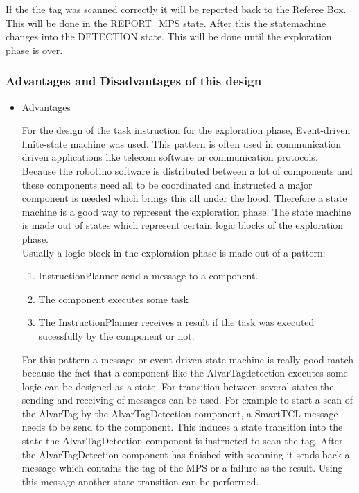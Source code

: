If the the tag was scanned correctly it will be reported back to the Referee Box. This will be done in the REPORT\_MPS state. After this the statemachine changes into the DETECTION state. This will be done until the exploration phase is over.

\subsubsection{Advantages and Disadvantages of this design} 

\begin{itemize}

\item Advantages

For the design of the task instruction for the exploration phase, Event-driven finite-state machine was used. This pattern is often used in communication driven applications
like telecom software or communication protocols. Because the robotino software is distributed between a lot of components and these components need all to be coordinated and instructed a major component is needed which brings this all under the hood. Therefore a state machine is a good way to represent the exploration phase. The state machine is made out of states which represent certain logic blocks of the exploration phase. \\


Usually a logic block in the exploration phase is made out of a pattern:

\begin{enumerate}

\item InstructionPlanner send a message to a component.

\item The component executes some task

\item The InstructionPlanner receives a result if the task was executed sucessfully by the 
component or not.  


\end{enumerate}

For this pattern a message or event-driven state machine is really good match because the fact that a component like the AlvarTagdetection executes some logic can be designed as a state. For transition between several states the sending and receiving of messages can be used. For example to start a scan of the AlvarTag by the AlvarTagDetection component, a SmartTCL message needs to be send to the component. This induces a state transition into the state the AlvarTagDetection component is instructed to scan the tag. After the AlvarTagDetection component has finished with scanning it sends back a message which contains the tag of the MPS or a failure as the result. Using this message another state transition can be performed. \\


\end{itemize}
